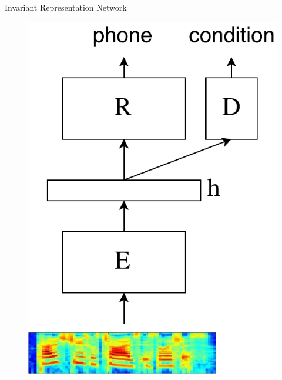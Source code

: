 \documentclass[final]{beamer}
\newlength{\onecolwid}
\newlength{\twocolwid}
\begin{document}
\begin{frame}[t]
\begin{columns}[t]
\begin{column}{\twocolwid}
\begin{columns}[t]
\begin{column}{\onecolwid}
\begin{block}{{\Large Invariant Representation Network}}
                \vspace{2cm}
                \begin{figure}
                    \centering
                    \includegraphics[width=0.7\linewidth]{model.pdf}
                \end{figure}
                \vspace{2cm}


\end{block}
\end{column}
\end{columns}
\end{column}
\end{columns}
\end{frame}
\end{document}
